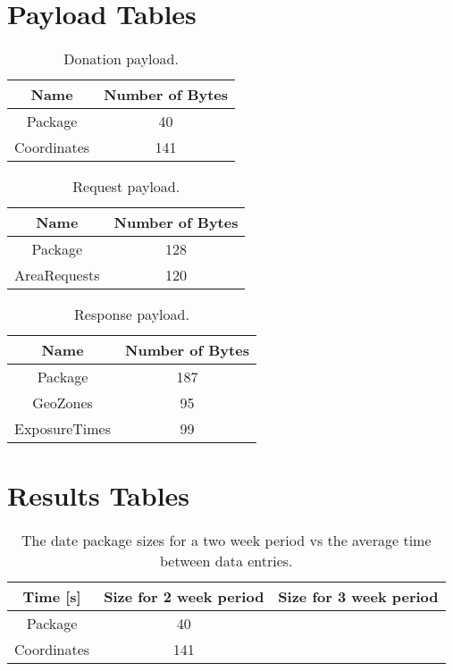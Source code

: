 \documentclass[a4paper,open right,12pt]{report}
\begin{document}
\section{Payload Tables}
\begin{table}[ht]
\centering
\caption{Donation payload.}
    \begin{tabular}[t]{cc}
    \hline
        Name & Number of Bytes\\
    \hline
        Package & 40 \\
        Coordinates & 141\\
    \hline
    \end{tabular}
\end{table}

\begin{table}[ht]
\centering
\caption{Request payload.}
    \begin{tabular}[t]{cc}
    \hline
        Name & Number of Bytes\\
    \hline
        Package & 128 \\
        AreaRequests & 120\\
    \hline
    \end{tabular}
\end{table}

\begin{table}[ht]
\centering
\caption{Response payload.}
    \begin{tabular}[t]{cc}
    \hline
        Name & Number of Bytes\\
    \hline
        Package & 187 \\
        GeoZones & 95\\
        ExposureTimes & 99\\
    \hline
    \end{tabular}
\end{table}

\section{Results Tables}
\begin{table}[ht]
\centering
\caption{The date package sizes for a two week period vs the average time between data entries.}
    \begin{tabular}[t]{ccc}
    \hline
        Time [s] & Size for 2 week period & Size for 3 week period\\
        
    \hline
        Package & 40 \\
        Coordinates & 141\\
    \hline
    \end{tabular}
\end{table}



\end{document}
